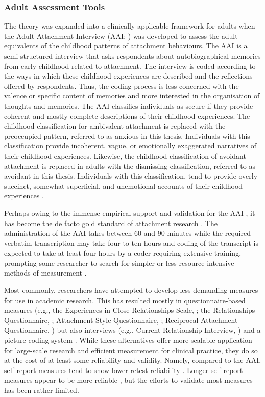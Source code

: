 \documentclass[12pt]{report}
\begin{document}
\subsubsection{Adult Assessment Tools}
The theory was expanded into a clinically applicable framework for adults when the Adult Attachment Interview (AAI; ) was developed to assess the adult equivalents of the childhood patterns of attachment behaviours.
The AAI is a semi-structured interview that asks respondents about autobiographical memories from early childhood related to attachment.
The interview is coded according to the ways in which these childhood experiences are described and the reflections offered by respondents.
Thus, the coding process is less concerned with the valence or specific content of memories and more interested in the organisation of thoughts and memories.
The AAI classifies individuals as secure if they provide coherent and mostly complete descriptions of their childhood experiences.
The childhood classification for ambivalent attachment is replaced with the preoccupied pattern, referred to as anxious in this thesis.
Individuals with this classification provide incoherent, vague, or emotionally exaggerated narratives of their childhood experiences.
Likewise, the childhood classification of avoidant attachment is replaced in adults with the dismissing classification, referred to as avoidant in this thesis.
Individuals with this classification, tend to provide overly succinct, somewhat superficial, and unemotional accounts of their childhood experiences \cite{Hesse1999, AAITest}.

Perhaps owing to the immense empirical support and validation for the AAI \cite{BakermansKranenburg1993, IJzendoorn1995, Crowell1996Discriminant, Sagi1994}, it has become the de facto gold standard of attachment research \cite{AAITest, Talia2019, haltigan2014adult}.
The administration of the AAI takes between 60 and 90 minutes while the required verbatim transcription may take four to ten hours and coding of the transcript is expected to take at least four hours by a coder requiring extensive training, prompting some researcher to search for simpler or less resource-intensive methods of measurement \cite{Haas1994}.

Most commonly, researchers have attempted to develop less demanding measures for use in academic research.
This has resulted mostly in questionnaire-based measures (e.g., the Experiences in Close Relationships Scale, ; the Relationships Questionnaire, ; Attachment Style Questionnaire, ; Reciprocal Attachment Questionnaire, ) but also interviews (e.g., Current Relationship Interview, ) and a picture-coding system \cite{George2012}.
While these alternatives offer more scalable application for large-scale research and efficient measurement for clinical practice, they do so at the cost of at least some reliability and validity.
Namely, compared to the AAI, self-report measures tend to show lower retest reliability \cite{Scharfe1994}.
Longer self-report measures appear to be more reliable \cite{Sibley2005,Wongpakaran2021}, but the efforts to validate most measures has been rather limited.
\end{document}

